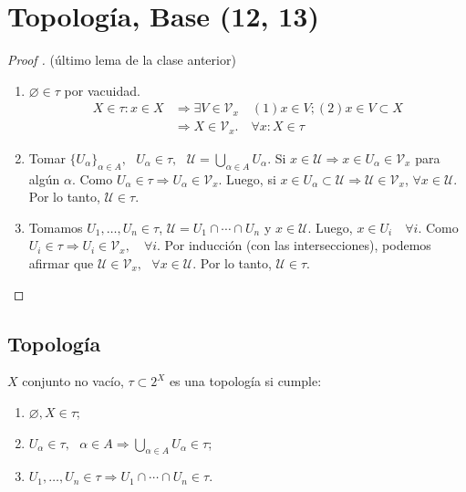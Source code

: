 
\section{Topología, Base (12, 13)}
\medskip
\begin{proof}[Proof ] (último lema de la clase anterior)
	\begin{enumerate}
		\item $\varnothing \in \tau$ por vacuidad.
		\begin{align*}
			X \in \tau : x \in X & \Rightarrow \exists V \in \mathcal{V}_x \quad (1) x \in V; (2) x \in V \subset X \\ & \Rightarrow X \in \mathcal{V}_x. \quad \forall x : X \in \tau 
		\end{align*}

		\item Tomar $\{ U_{\alpha} \}_{\alpha \in A}, \text{ } U_{\alpha} \in \tau, \text{ } \mathcal{U} = \bigcup_{\alpha \in A} U_{\alpha}$. Si $x \in \mathcal{U} \Rightarrow x \in U_{\alpha} \in \mathcal{V}_x$ para algún $\alpha$. Como $U_{\alpha} \in \tau \Rightarrow U_{\alpha} \in \mathcal{V}_x$. Luego, si $x \in U_{\alpha} \subset \mathcal{U} \Rightarrow \mathcal{U} \in \mathcal{V}_x$, $\forall x \in \mathcal{U}$. Por lo tanto, $\mathcal{U} \in \tau$.

		\item Tomamos $U_1,\dots,U_n \in \tau$, $\mathcal{U} = U_1 \cap \cdots \cap U_n$ y $x \in \mathcal{U}$. Luego, $x \in U_i \quad \forall i$. Como $U_i \in \tau \Rightarrow U_i \in \mathcal{V}_x, \quad \forall i$. Por inducción (con las intersecciones), podemos afirmar que $\mathcal{U} \in \mathcal{V}_x, \text{ } \forall x \in \mathcal{U}$. Por lo tanto, $\mathcal{U} \in \tau$. 
	\end{enumerate}
\end{proof}

\subsection{Topología}

\begin{definition}[topología]
	$X$ conjunto no vacío, $\tau \subset 2^X$ es una topología si cumple:

	\begin{enumerate}
		\item $\varnothing, X \in \tau$;

		\item $U_{\alpha} \in \tau, \text{ } \alpha \in A \Rightarrow \bigcup_{\alpha \in A} U_{\alpha} \in \tau$;

		\item $U_1,\dots,U_n \in \tau \Rightarrow U_1 \cap \cdots \cap U_n \in \tau$.
	\end{enumerate}
\end{definition}

